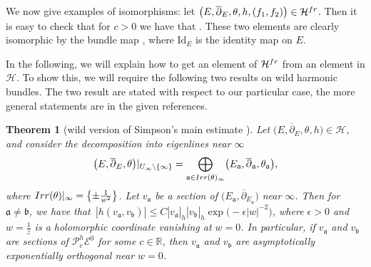 \documentclass[11pt]{article}
\numberwithin{equation}{section}
\newtheorem{Theorem}{Theorem}[section]
\numberwithin{equation}{section}
\begin{document}
\begin{Example} \label{exmorph} We now give examples of isomorphisms: let $\bigl(E,\overline{\partial}_E,\theta,h,(f_1,f_2)\bigr)\in \mathcal{H}^{{\rm fr}}$. Then it is easy to check that for $c>0$ we have that . These two elements are clearly isomorphic by the bundle map , where $\text{Id}_E$ is the identity map on $E$.
\end{Example}

In the following, we will explain how to get an element of $\mathcal{H}^{{\rm fr}}$ from an element in $\mathcal{H}$. To show this, we will require the following two results on wild harmonic bundles. The two result are stated with respect to our particular case, the more general statements are in the given references.

\begin{Theorem}[{wild version of Simpson's main estimate \cite[Theorem 7.2.1]{M}}]\label{FT1} Let $\bigl(E,\overline{\partial}_E,\theta,h\bigr)\allowbreak\in \mathcal{H}$, and consider the decomposition into eigenlines near $\infty$
\begin{equation*}
\bigl(E,\overline{\partial}_E,\theta\bigr)|_{U_{\infty}\setminus \{\infty\}}=\bigoplus_{\mathfrak{a}\in \textnormal{Irr}(\theta)_{\infty}} \bigl(E_{\mathfrak{a}},\overline{\partial}_{\mathfrak{a}},\theta_{\mathfrak{a}}\bigr),
\end{equation*}
where $\textnormal{Irr}(\theta)|_{\infty}=\bigl\{\pm \frac{1}{w^2}\bigr\}$. Let $v_{\mathfrak{a}}$ be a section of $\bigl(E_{\mathfrak{a}},\overline{\partial}_{E_{\mathfrak{a}}}\bigr)$ near $\infty$. Then for $\mathfrak{a}\neq \mathfrak{b}$, we have that~${
 |h(v_{\mathfrak{a}},v_{\mathfrak{b}})|\leq C|v_{\mathfrak{a}}|_h|v_{\mathfrak{b}}|_h\exp \bigl(-\epsilon|w|^{-2}\bigr)}$,
where $\epsilon>0$ and $w=\frac{1}{z}$ is a holomorphic coordinate vanishing at $w=0$. In particular, if $v_{\mathfrak{a}}$ and $v_{\mathfrak{b}}$ are sections of $\mathcal{P}^h_c\mathcal{E}^0$ for some $c \in \mathbb{R}$, then $v_{\mathfrak{a}}$ and $v_{\mathfrak{b}}$ are asymptotically exponentially orthogonal near $w=0$.
\end{Theorem}
\end{document}
